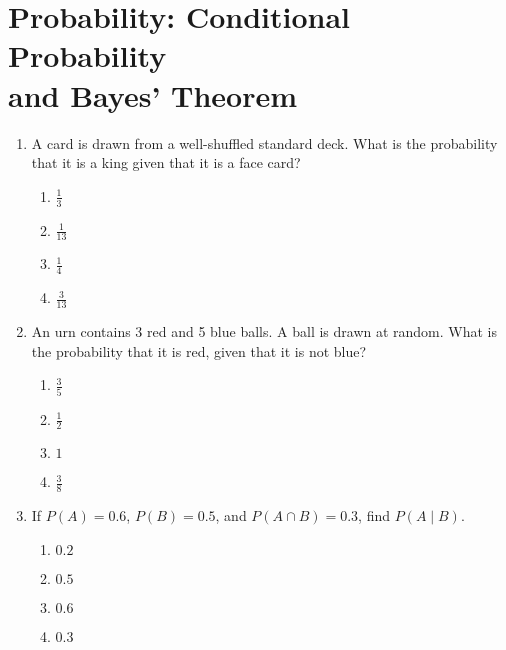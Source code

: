\section[Probability: Conditional Probability and Bayes' Theorem]
{Probability: Conditional Probability\\ and Bayes' Theorem}


\begin{enumerate}

\item A card is drawn from a well-shuffled standard deck. What is the probability that it is a king given that it is a face card?

\begin{enumerate}[label=(\alph*)]
\item \(\frac{1}{3}\) \quad \item \(\frac{1}{13}\) \quad \item \(\frac{1}{4}\) \quad \item \(\frac{3}{13}\)
\end{enumerate}

\item An urn contains 3 red and 5 blue balls. A ball is drawn at random. What is the probability that it is red, given that it is not blue?

\begin{enumerate}[label=(\alph*)]
\item \(\frac{3}{5}\) \quad \item \(\frac{1}{2}\) \quad \item \(1\) \quad \item \(\frac{3}{8}\)
\end{enumerate}

\item If \(P(A) = 0.6\), \(P(B) = 0.5\), and \(P(A \cap B) = 0.3\), find \(P(A \mid B)\).

\begin{enumerate}[label=(\alph*)]
\item \(0.2\) \quad \item \(0.5\) \quad \item \(0.6\) \quad \item \(0.3\)
\end{enumerate}


\end{enumerate}
